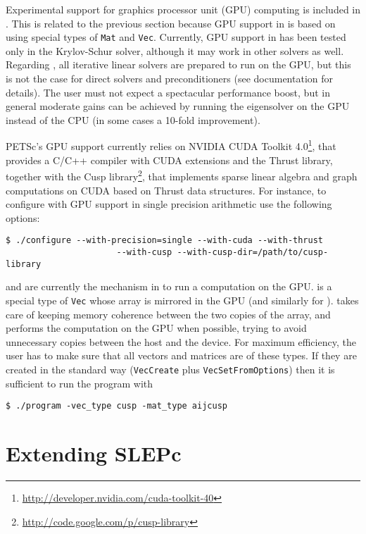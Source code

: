 Experimental support for graphics processor unit (GPU) computing is included in . This is related to the previous section because GPU support in \petsc is based on using special types of \texttt{Mat} and \texttt{Vec}. Currently, GPU support in \slepc has been tested only in the Krylov-Schur  solver, although it may work in other solvers as well. Regarding \petsc, all iterative linear solvers are prepared to run on the GPU, but this is not the case for direct solvers and preconditioners (see \petsc documentation for details). The user must not expect a spectacular performance boost, but in general moderate gains can be achieved by running the eigensolver on the GPU instead of the CPU (in some cases a 10-fold improvement).

PETSc's GPU support currently relies on NVIDIA CUDA Toolkit 4.0\footnote{\url{http://developer.nvidia.com/cuda-toolkit-40}}, that provides a C/C++ compiler with CUDA extensions and the Thrust library, together with the Cusp library\footnote{\url{http://code.google.com/p/cusp-library}}, that implements sparse linear algebra and graph computations on CUDA based on Thrust data structures. For instance, to configure \petsc with GPU support in single precision arithmetic use the following options:
	\begin{Verbatim}[fontsize=\small]
	$ ./configure --with-precision=single --with-cuda --with-thrust
                      --with-cusp --with-cusp-dir=/path/to/cusp-library
	\end{Verbatim}

 and  are currently the mechanism in \petsc to run a computation on the GPU.  is a special type of \texttt{Vec} whose array is mirrored in the GPU (and similarly for ). \petsc takes care of keeping memory coherence between the two copies of the array, and performs the computation on the GPU when possible, trying to avoid unnecessary copies between the host and the device. For maximum efficiency, the user has to make sure that all vectors and matrices are of these types. If they are created in the standard way (\texttt{VecCreate} plus \texttt{VecSetFromOptions}) then it is sufficient to run the program with
	\begin{Verbatim}[fontsize=\small]
	$ ./program -vec_type cusp -mat_type aijcusp
	\end{Verbatim}

\section{Extending SLEPc}
\label{sec:shell}

